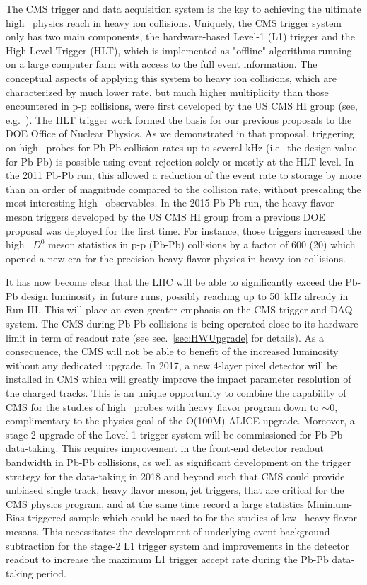 The CMS trigger and data acquisition system is the key to achieving the ultimate high \pt\ physics reach in heavy ion collisions. Uniquely, the CMS trigger system only has two main components, the hardware-based Level-1 (L1) trigger and the High-Level Trigger (HLT), which is implemented as "offline" algorithms running on a large computer farm with access to the full event information.  
The conceptual aspects of applying this system to heavy ion collisions, which are characterized by much lower rate, but much higher multiplicity than those encountered in p-p collisions, were first developed by the US CMS HI group (see, e.g.\ \cite{Roland:2007is}). The HLT trigger work formed the basis for our previous proposals to the DOE Office of Nuclear Physics. As we demonstrated in that proposal, triggering on high \pt\ probes for Pb-Pb collision rates up to several kHz (i.e.\ the design value for Pb-Pb) is possible using event rejection solely or mostly at the HLT level. In the 2011 Pb-Pb run, this allowed a reduction of the event rate to storage by more than an order of magnitude compared to the collision rate, without prescaling the most interesting high \pt\ observables. In the 2015 Pb-Pb run, the heavy flavor meson triggers developed by the US CMS HI group from a previous DOE proposal was deployed for the first time. For instance, those triggers increased the high \pt\ $D^0$ meson statistics in p-p (Pb-Pb) collisions by a factor of 600 (20) which opened a new era for the precision heavy flavor physics in heavy ion collisions.

It has now become clear that the LHC will be able to significantly exceed the Pb-Pb design luminosity in future runs, possibly reaching up to 50~kHz already in Run III. This will place an even greater emphasis on the CMS trigger and DAQ system. The CMS during Pb-Pb collisions is being operated close to its hardware limit in term of readout rate (see sec.~\ref{sec:HWUpgrade} for details). As a consequence, the CMS will not be able to benefit of the increased luminosity without any dedicated upgrade. 
In 2017, a new 4-layer pixel detector will be installed in CMS which will greatly improve the impact parameter resolution of the charged tracks. This is an unique opportunity to combine the capability of CMS for the studies of high \pt\ probes with heavy flavor program down to \pt$\sim 0$, complimentary to the physics goal of the O(100M) ALICE upgrade. Moreover, a stage-2 upgrade of the Level-1 trigger system will be commissioned for Pb-Pb data-taking. This requires improvement in the front-end detector readout bandwidth in Pb-Pb collisions, as well as significant development on the trigger strategy for the data-taking in 2018 and beyond such that CMS could provide unbiased single track, heavy flavor meson, jet triggers, that are critical for the CMS physics program, and at the same time record a large statistics Minimum-Bias triggered sample which could be used to for the studies of low \pt\ heavy flavor mesons. This necessitates the development of underlying event background subtraction for the stage-2 L1 trigger system and improvements in the detector readout to increase the maximum L1 trigger accept rate during the Pb-Pb data-taking period.


